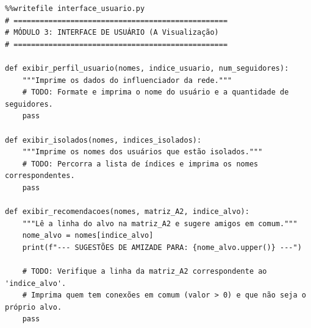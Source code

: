 \documentclass[../numerical_methods.tex]{subfiles}
\begin{document}
\begin{listing}[H]
	\caption{\textbf{Redes Sociais:} Interface de Usuário}
	\begin{verbatim}
%%writefile interface_usuario.py
# =================================================
# MÓDULO 3: INTERFACE DE USUÁRIO (A Visualização)
# =================================================

def exibir_perfil_usuario(nomes, indice_usuario, num_seguidores):
    """Imprime os dados do influenciador da rede."""
    # TODO: Formate e imprima o nome do usuário e a quantidade de seguidores.
    pass

def exibir_isolados(nomes, indices_isolados):
    """Imprime os nomes dos usuários que estão isolados."""
    # TODO: Percorra a lista de índices e imprima os nomes correspondentes.
    pass

def exibir_recomendacoes(nomes, matriz_A2, indice_alvo):
    """Lê a linha do alvo na matriz_A2 e sugere amigos em comum."""
    nome_alvo = nomes[indice_alvo]
    print(f"--- SUGESTÕES DE AMIZADE PARA: {nome_alvo.upper()} ---")

    # TODO: Verifique a linha da matriz_A2 correspondente ao 'indice_alvo'.
    # Imprima quem tem conexões em comum (valor > 0) e que não seja o próprio alvo.
    pass
 \end{verbatim}
\end{listing}
\end{document}
